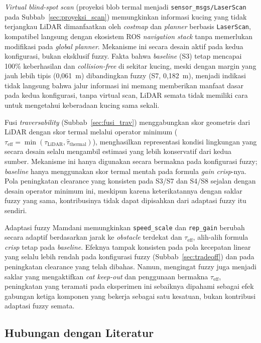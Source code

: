 \textit{Virtual blind-spot scan} (proyeksi blob termal menjadi
\texttt{sensor\_msgs/LaserScan} pada Subbab~\ref{sec:proyeksi_scan})
memungkinkan informasi kucing yang tidak terjangkau LiDAR dimanfaatkan oleh
\textit{costmap} dan \textit{planner} berbasis \texttt{LaserScan}, kompatibel
langsung dengan ekosistem ROS \textit{navigation stack} tanpa memerlukan
modifikasi pada \textit{global planner}. Mekanisme ini secara desain aktif
pada kedua konfigurasi, bukan eksklusif fuzzy. Fakta bahwa \textit{baseline}
(S3) tetap mencapai 100\% keberhasilan dan \textit{collision-free} di sekitar
kucing, meski dengan margin yang jauh lebih tipis (0,061~m) dibandingkan
fuzzy (S7, 0,182~m), menjadi indikasi tidak langsung bahwa jalur informasi
ini memang memberikan manfaat dasar pada kedua konfigurasi, tanpa virtual
scan, LiDAR semata tidak memiliki cara untuk mengetahui keberadaan kucing
sama sekali.

Fusi \textit{traversability} (Subbab~\ref{sec:fusi_trav}) menggabungkan skor
geometris dari LiDAR dengan skor termal melalui operator minimum
($\tau_\text{eff} = \min(\tau_\text{LiDAR}, \hat{\tau}_\text{thermal})$),
menghasilkan representasi kondisi lingkungan yang secara desain selalu
mengambil estimasi yang lebih konservatif dari kedua sumber. Mekanisme ini
hanya digunakan secara bermakna pada konfigurasi fuzzy; \textit{baseline}
hanya menggunakan skor termal mentah pada formula \textit{gain crisp}-nya.
Pola peningkatan clearance yang konsisten pada S3/S7 dan S4/S8 sejalan
dengan desain operator minimum ini, meskipun karena keterikatannya dengan
saklar fuzzy yang sama, kontribusinya tidak dapat dipisahkan dari adaptasi
fuzzy itu sendiri.

Adaptasi fuzzy Mamdani memungkinkan \texttt{speed\_scale} dan
\texttt{rep\_gain} berubah secara adaptif berdasarkan jarak ke \textit{obstacle}
terdekat dan $\tau_\text{eff}$, alih-alih formula \textit{crisp} tetap pada
\textit{baseline}. Efeknya tampak konsisten pada pola kecepatan linear yang
selalu lebih rendah pada konfigurasi fuzzy (Subbab~\ref{sec:tradeoff}) dan
pada peningkatan clearance yang telah dibahas. Namun, mengingat fuzzy juga
menjadi saklar yang mengaktifkan \textit{cat keep-out} dan penggunaan
bermakna $\tau_\text{eff}$, peningkatan yang teramati pada eksperimen ini
sebaiknya dipahami sebagai efek gabungan ketiga komponen yang bekerja
sebagai satu kesatuan, bukan kontribusi adaptasi fuzzy semata.

\subsection{Hubungan dengan Literatur}

